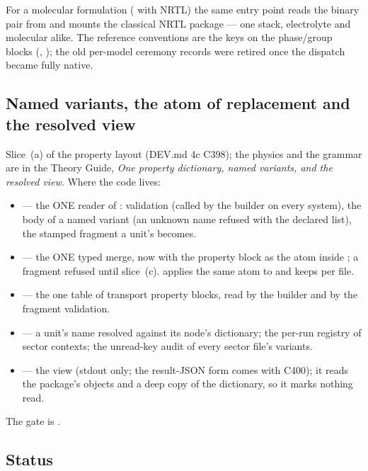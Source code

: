 \documentclass[11pt,a4paper]{article}
\begin{document}
For a molecular formulation ( with NRTL) the same entry
point reads the binary pair from  and mounts the
classical NRTL package --- one stack, electrolyte and molecular alike.  The
reference conventions are the  keys on the phase/group
blocks (, ); the old per-model
 ceremony records were retired once the dispatch
became fully native.

\subsection{Named variants, the atom of replacement and the resolved view}\label{sec:property-variants-dev}

Slice~(a) of the property layout (DEV.md 4c C398); the physics and the
grammar are in the Theory Guide, \emph{One property dictionary, named
variants, and the resolved view}.  Where the code lives:
\begin{itemize}
\item {} --- the ONE reader of
  : validation (called by the builder on every system),
  the body of a named variant (an unknown name refused with the declared
  list), the stamped fragment a unit's  becomes.
\item {} --- the ONE typed merge, now with the
  property block as the atom inside ; a fragment
   refused until slice~(c).  
  applies the same atom to  and keeps  per file.
\item {} --- the one table of transport
  property blocks, read by the builder and by the fragment validation.
\item {} --- a unit's name
  resolved against its node's dictionary; the per-run registry of sector
  contexts; the unread-key audit of every sector file's variants.
\item {} --- the view (stdout only;
  the result-JSON form comes with C400); it reads the package's objects and a
  deep copy of the dictionary, so it marks nothing read.
\end{itemize}
The gate is .

\subsection{Status}
\end{document}
